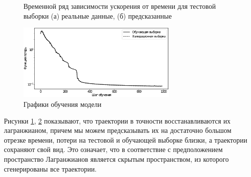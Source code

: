 \documentclass[a4paper, 12pt]{article}
\begin{document}
\begin{figure}[!htbp]
 \centering
 
 \caption{Временной ряд зависимости ускорения от времени для тестовой выборки (а) реальные данные, (б) предсказанные}
 \label{fig: trajectory}
\end{figure}

\begin{figure}[!htbp]
 \centering
 \includegraphics[width=0.7\textwidth]{experiment4_1000.pickle_loss.eps}
 \caption{Графики обучения модели}
 \label{fig: learning_rate}
\end{figure}

Рисунки \ref{fig: trajectory}, \ref{fig: learning_rate} показывают, что траектории в точности восстанавливаются их лагранжианом, причем мы можем предсказывать их на достаточно большом отрезке времени, потери на тестовой и обучающей выборке близки, а траектории сохраняют свой вид. Это означает, что в соответствие с предположением пространство Лагранжианов является скрытым пространством, из которого сгенерированы все траектории.
\end{document}
